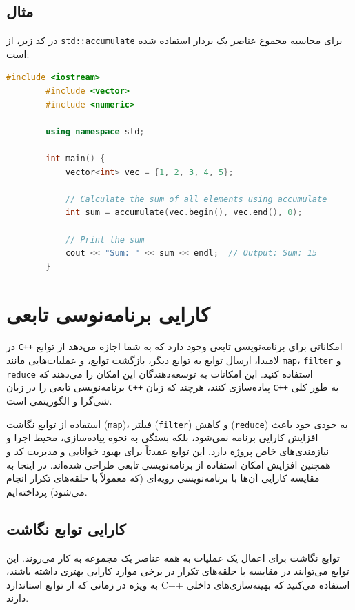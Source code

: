 \documentclass[12pt, a4paper]{report}
\begin{document}
\subsection{مثال}
در کد زیر، از \texttt{std::accumulate} برای محاسبه مجموع عناصر یک بردار استفاده شده است:

\begin{LTR}
	\begin{lstlisting}[language=C++, breaklines=true]
		#include <iostream>
		#include <vector>
		#include <numeric>
		
		using namespace std;
		
		int main() {
			vector<int> vec = {1, 2, 3, 4, 5};
			
			// Calculate the sum of all elements using accumulate
			int sum = accumulate(vec.begin(), vec.end(), 0);
			
			// Print the sum
			cout << "Sum: " << sum << endl;  // Output: Sum: 15
		}
	\end{lstlisting}
\end{LTR}

\section{کارایی برنامه‌نوسی تابعی}


در \texttt{C++} امکاناتی برای برنامه‌نویسی تابعی وجود دارد که به شما اجازه می‌دهد از توابع لامبدا، ارسال توابع به توابع دیگر، بازگشت توابع، و عملیات‌هایی مانند \texttt{map}، \texttt{filter} و \texttt{reduce} استفاده کنید. این امکانات به توسعه‌دهندگان این امکان را می‌دهند که برنامه‌نویسی تابعی را در زبان \texttt{C++} پیاده‌سازی کنند، هرچند که زبان \texttt{C++} به طور کلی شی‌گرا و الگوریتمی است.

استفاده از توابع نگاشت (\texttt{map})، فیلتر (\texttt{filter}) و کاهش (\texttt{reduce}) به خودی خود باعث افزایش کارایی برنامه نمی‌شود، بلکه بستگی به نحوه پیاده‌سازی، محیط اجرا و نیازمندی‌های خاص پروژه دارد. این توابع عمدتاً برای بهبود خوانایی و مدیریت کد و همچنین افزایش امکان استفاده از برنامه‌نویسی تابعی طراحی شده‌اند. در اینجا به مقایسه کارایی آن‌ها با برنامه‌نویسی رویه‌ای (که معمولاً با حلقه‌های تکرار انجام می‌شود) پرداخته‌ایم.


\subsection{کارایی توابع نگاشت}

توابع نگاشت برای اعمال یک عملیات به همه عناصر یک مجموعه به کار می‌روند. این توابع می‌توانند در مقایسه با حلقه‌های تکرار در برخی موارد کارایی بهتری داشته باشند، به ویژه در زمانی که از توابع استاندارد C++ استفاده می‌کنید که بهینه‌سازی‌های داخلی دارند.
\end{document}
